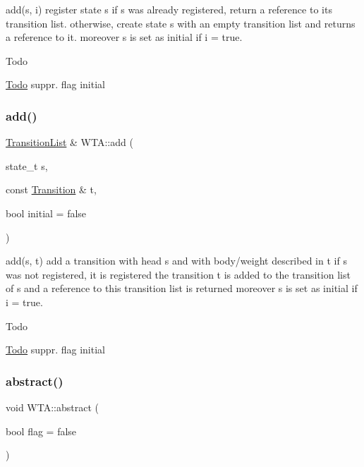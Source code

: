 add(s, i) register state s if s was already registered, return a reference to its transition list. otherwise, create state s with an empty transition list and returns a reference to it. moreover s is set as initial if i = true. 

\begin{DoxyRefDesc}{Todo}
\item[\mbox{\hyperlink{todo__todo000018}{Todo}}]suppr. flag initial \end{DoxyRefDesc}
\mbox{\label{group__schemata_ga01de1e03d09518b38ab69a2075276ae2}} 
\subsubsection{\texorpdfstring{add()}{add()}\hspace{0.1cm}{\footnotesize\ttfamily [3/3]}}
{\footnotesize\ttfamily \mbox{\hyperlink{classTransitionList}{Transition\+List}} \& W\+T\+A\+::add (\begin{DoxyParamCaption}\item[{state\+\_\+t}]{s,  }\item[{const \mbox{\hyperlink{classTransition}{Transition}} \&}]{t,  }\item[{bool}]{initial = {\ttfamily false} }\end{DoxyParamCaption})}



add(s, t) add a transition with head s and with body/weight described in t if s was not registered, it is registered the transition t is added to the transition list of s and a reference to this transition list is returned moreover s is set as initial if i = true. 

\begin{DoxyRefDesc}{Todo}
\item[\mbox{\hyperlink{todo__todo000019}{Todo}}]suppr. flag initial \end{DoxyRefDesc}
\mbox{\label{group__schemata_ga91e272f4f9463149cd296f48e65a4185}} 
\subsubsection{\texorpdfstring{abstract()}{abstract()}}
{\footnotesize\ttfamily void W\+T\+A\+::abstract (\begin{DoxyParamCaption}\item[{bool}]{flag = {\ttfamily false} }\end{DoxyParamCaption})}



